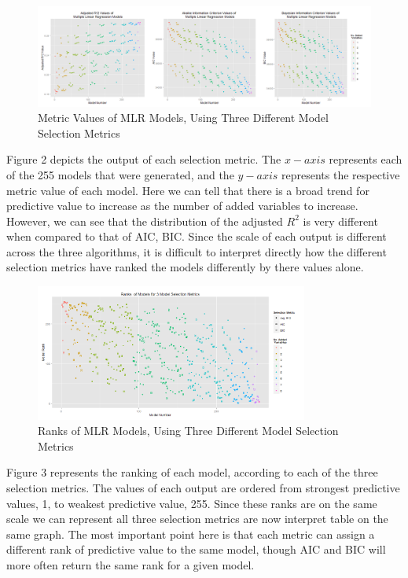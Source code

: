 \documentclass{article}\usepackage[]{graphicx}\usepackage[]{color}
\begin{document}
\begin{figure}[h]
\begin{center}
    \centering
    \includegraphics[width=1\textwidth]{3crits.png}
    \caption{Metric Values of MLR Models, Using Three Different  Model Selection Metrics}
    \label{fig:awesome_image}
\end{center}
\end{figure}
  
  Figure 2 depicts the output of each selection metric.  The $x-axis$ represents each of the 255 models that were generated, and the $y-axis$ represents the respective metric value of each model.  Here we can tell that there is a broad trend for predictive value to increase as the number of added variables to increase.  However, we can see that the distribution of the adjusted $R^2$ is very different when compared to that of AIC, BIC. Since the scale of each output is different across the three algorithms, it is difficult to interpret directly how the different selection metrics have ranked the models differently by there values alone. 
  
\begin{figure}[h]
\begin{center}
    \centering
    \includegraphics[width=0.8\textwidth]{rank1.png}
    \caption{Ranks of MLR Models, Using Three Different  Model Selection Metrics}
    \label{fig:awesome_image}
\end{center}
\end{figure}  
  Figure 3 represents the ranking of each model, according to each of the three selection metrics. The values of each output are ordered from strongest predictive values, 1, to weakest predictive value, 255.  Since these ranks are on the same scale we can represent all three selection metrics are now interpret table on the same graph.  The most important point here is that each metric can assign a different rank of predictive value to the same model, though AIC and BIC will more often return the same rank for a given model.
\end{document}
